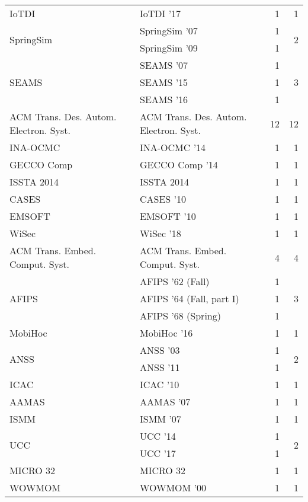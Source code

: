 \begin{table*}[t]
\begin{tabular}{llrr}
\multirow{1}{*}{IoTDI } & IoTDI '17 & 1 & \multirow{1}{*}{1}\\
\multirow{2}{*}{SpringSim } & SpringSim '07 & 1 & \multirow{2}{*}{2}\\
& SpringSim '09 & 1 &\\
\multirow{3}{*}{SEAMS } & SEAMS '07 & 1 & \multirow{3}{*}{3}\\
& SEAMS '15 & 1 &\\
& SEAMS '16 & 1 &\\
\multirow{1}{*}{ACM Trans. Des. Autom. Electron. Syst.} & ACM Trans. Des. Autom. Electron. Syst. & 12 & \multirow{1}{*}{12}\\
\multirow{1}{*}{INA-OCMC } & INA-OCMC '14 & 1 & \multirow{1}{*}{1}\\
\multirow{1}{*}{GECCO Comp } & GECCO Comp '14 & 1 & \multirow{1}{*}{1}\\
\multirow{1}{*}{ISSTA 2014} & ISSTA 2014 & 1 & \multirow{1}{*}{1}\\
\multirow{1}{*}{CASES } & CASES '10 & 1 & \multirow{1}{*}{1}\\
\multirow{1}{*}{EMSOFT } & EMSOFT '10 & 1 & \multirow{1}{*}{1}\\
\multirow{1}{*}{WiSec } & WiSec '18 & 1 & \multirow{1}{*}{1}\\
\multirow{1}{*}{ACM Trans. Embed. Comput. Syst.} & ACM Trans. Embed. Comput. Syst. & 4 & \multirow{1}{*}{4}\\
\multirow{3}{*}{AFIPS } & AFIPS '62 (Fall) & 1 & \multirow{3}{*}{3}\\
& AFIPS '64 (Fall, part I) & 1 &\\
& AFIPS '68 (Spring) & 1 &\\
\multirow{1}{*}{MobiHoc } & MobiHoc '16 & 1 & \multirow{1}{*}{1}\\
\multirow{2}{*}{ANSS } & ANSS '03 & 1 & \multirow{2}{*}{2}\\
& ANSS '11 & 1 &\\
\multirow{1}{*}{ICAC } & ICAC '10 & 1 & \multirow{1}{*}{1}\\
\multirow{1}{*}{AAMAS } & AAMAS '07 & 1 & \multirow{1}{*}{1}\\
\multirow{1}{*}{ISMM } & ISMM '07 & 1 & \multirow{1}{*}{1}\\
\multirow{2}{*}{UCC } & UCC '14 & 1 & \multirow{2}{*}{2}\\
& UCC '17 & 1 &\\
\multirow{1}{*}{MICRO 32} & MICRO 32 & 1 & \multirow{1}{*}{1}\\
\multirow{1}{*}{WOWMOM } & WOWMOM '00 & 1 & \multirow{1}{*}{1}\\

\end{tabular}
\end{table*}
